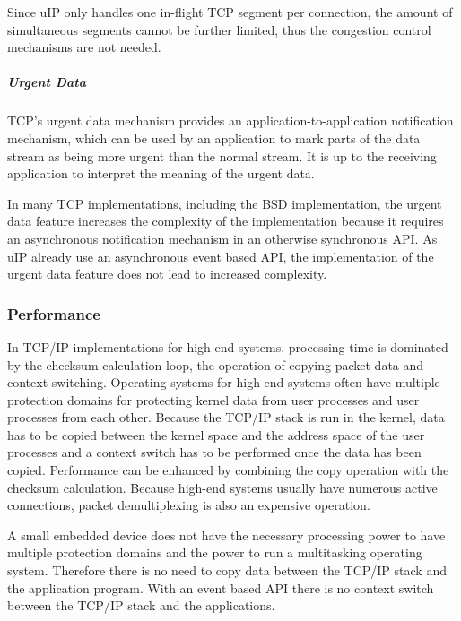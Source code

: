 \-Since u\-I\-P only handles one in-\/flight \-T\-C\-P segment per connection, the amount of simultaneous segments cannot be further limited, thus the congestion control mechanisms are not needed.\hypertarget{a00060_urgdata}{}\subparagraph{\-Urgent Data}\label{a00060_urgdata}
\-T\-C\-P's urgent data mechanism provides an application-\/to-\/application notification mechanism, which can be used by an application to mark parts of the data stream as being more urgent than the normal stream. \-It is up to the receiving application to interpret the meaning of the urgent data.

\-In many \-T\-C\-P implementations, including the \-B\-S\-D implementation, the urgent data feature increases the complexity of the implementation because it requires an asynchronous notification mechanism in an otherwise synchronous \-A\-P\-I. \-As u\-I\-P already use an asynchronous event based \-A\-P\-I, the implementation of the urgent data feature does not lead to increased complexity.\hypertarget{a00060_performance}{}\subsubsection{\-Performance}\label{a00060_performance}
\-In \-T\-C\-P/\-I\-P implementations for high-\/end systems, processing time is dominated by the checksum calculation loop, the operation of copying packet data and context switching. \-Operating systems for high-\/end systems often have multiple protection domains for protecting kernel data from user processes and user processes from each other. \-Because the \-T\-C\-P/\-I\-P stack is run in the kernel, data has to be copied between the kernel space and the address space of the user processes and a context switch has to be performed once the data has been copied. \-Performance can be enhanced by combining the copy operation with the checksum calculation. \-Because high-\/end systems usually have numerous active connections, packet demultiplexing is also an expensive operation.

\-A small embedded device does not have the necessary processing power to have multiple protection domains and the power to run a multitasking operating system. \-Therefore there is no need to copy data between the \-T\-C\-P/\-I\-P stack and the application program. \-With an event based \-A\-P\-I there is no context switch between the \-T\-C\-P/\-I\-P stack and the applications.

